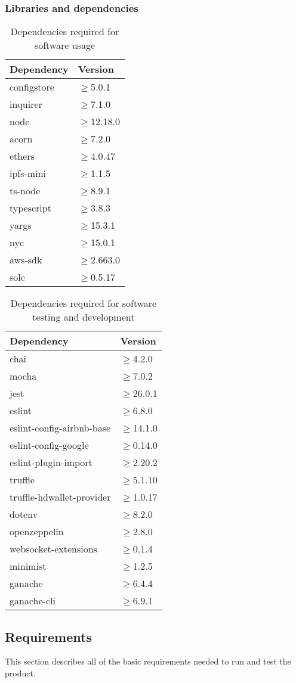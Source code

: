 \subsubsection{Libraries and dependencies}
\begin{longtable}[h!]{
		>{\centering\arraybackslash}p{}
		>{\centering\arraybackslash}p{} }
	\caption{Dependencies required for software usage} \\

	\textbf{\color{white}Dependency} &
	\textbf{\color{white}Version}
	\tabularnewline
	\endhead

	configstore & $\geq$5.0.1 \tabularnewline
	inquirer & $\geq$7.1.0 \tabularnewline
	node & $\geq$12.18.0 \tabularnewline
	acorn & $\geq$7.2.0 \tabularnewline
	ethers & $\geq$4.0.47 \tabularnewline
	ipfs-mini & $\geq$1.1.5 \tabularnewline
	ts-node & $\geq$8.9.1 \tabularnewline
	typescript & $\geq$3.8.3 \tabularnewline
	yargs & $\geq$15.3.1 \tabularnewline
	nyc & $\geq$15.0.1 \tabularnewline
	aws-sdk & $\geq$2.663.0 \tabularnewline
	solc & $\geq$0.5.17 \tabularnewline

\end{longtable}
\begin{longtable}{
		>{\centering\arraybackslash}p{}
		>{\centering\arraybackslash}p{} }
	\caption{Dependencies required for software testing and development} \\

	\textbf{\color{white}Dependency} &
	\textbf{\color{white}Version}
	\tabularnewline
	\endhead

	chai & $\geq$4.2.0 \tabularnewline
	mocha & $\geq$7.0.2 \tabularnewline
	jest & $\geq$26.0.1 \tabularnewline
	eslint & $\geq$6.8.0 \tabularnewline
	eslint-config-airbnb-base & $\geq$14.1.0 \tabularnewline
	eslint-config-google & $\geq$0.14.0 \tabularnewline
	eslint-plugin-import & $\geq$2.20.2 \tabularnewline
	truffle & $\geq$5.1.10 \tabularnewline
	truffle-hdwallet-provider & $\geq$1.0.17 \tabularnewline
	dotenv & $\geq$8.2.0 \tabularnewline
	openzeppelin & $\geq$2.8.0 \tabularnewline
	websocket-extensions & $\geq$0.1.4 \tabularnewline
	minimist & $\geq$1.2.5 \tabularnewline
	ganache & $\geq$6.4.4 \tabularnewline
	ganache-cli & $\geq$6.9.1 \tabularnewline

\end{longtable}
\subsection{Requirements}
This section describes all of the basic requirements needed to run and test the product.
